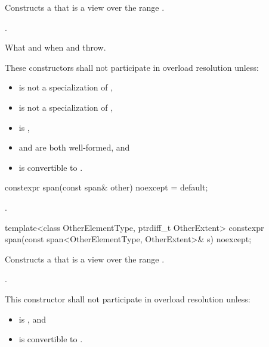 \begin{codeblock}
\begin{codeblock}
\begin{codeblock}
\begin{itemdescr}
\pnum
\effects
Constructs a  that is a view over the range .

\pnum
\postconditions
{}.

\pnum
\throws
What and when  and  throw.

\pnum
\remarks
These constructors shall not participate in overload resolution unless:
\begin{itemize}
\item {} is not a specialization of ,
\item {} is not a specialization of ,
\item {} is ,
\item {} and  are both well-formed, and
\item {} is convertible to .
\end{itemize}
\end{itemdescr}

%
\begin{itemdecl}
constexpr span(const span& other) noexcept = default;
\end{itemdecl}
\begin{itemdescr}
\pnum
\postconditions
{}.
\end{itemdescr}

%
\begin{itemdecl}
template<class OtherElementType, ptrdiff_t OtherExtent>
  constexpr span(const span<OtherElementType, OtherExtent>& s) noexcept;
\end{itemdecl}
\begin{itemdescr}
\pnum
\effects
Constructs a  that is a view over the range
.

\pnum
\postconditions
{}.

\pnum
\remarks
This constructor shall not participate in overload resolution unless:
\begin{itemize}
\item {} is , and
\item {} is convertible to .
\end{itemize}
\end{itemdescr}


\end{codeblock}
\end{codeblock}
\end{codeblock}
